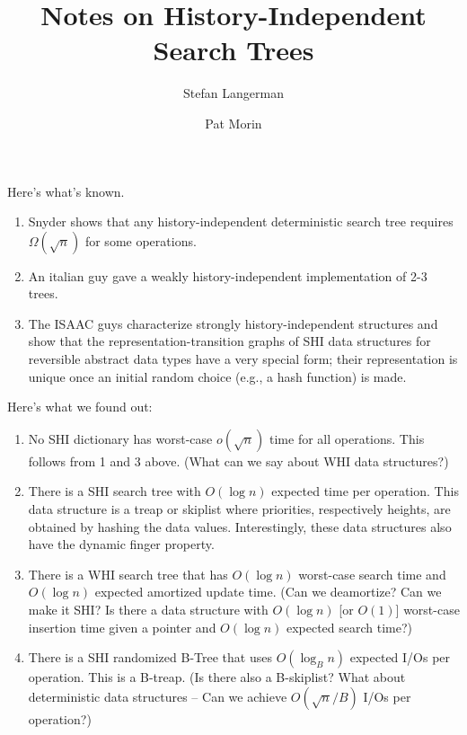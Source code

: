 \documentclass{article}
\title{Notes on History-Independent Search Trees}
\author{Stefan Langerman \and Pat Morin}
\begin{document}
\maketitle

Here's what's known.

\begin{enumerate}
\item Snyder shows that any history-independent deterministic search
tree requires $\Omega(\sqrt{n})$ for some operations.  

\item An italian guy gave a weakly history-independent implementation
of 2-3 trees.  

\item The ISAAC guys characterize strongly history-independent
structures and show that the representation-transition graphs of SHI
data structures for reversible abstract data types have a very special
form; their representation is unique once an initial random choice
(e.g., a hash function) is made.

\end{enumerate}

Here's what we found out:
\begin{enumerate}

\item No SHI dictionary has worst-case $o(\sqrt{n})$ time for all
operations.  This follows from 1 and 3 above.  (What can we say about
WHI data structures?)

\item There is a SHI search tree with $O(\log n)$ expected time per
operation.  This data structure is a treap or skiplist where
priorities, respectively heights, are obtained by hashing the data
values.  Interestingly, these data structures also have the dynamic
finger property.

\item There is a WHI search tree that has $O(\log n)$ worst-case
search time and $O(\log n)$ expected amortized update time.  (Can we
deamortize?  Can we make it SHI? Is there a data structure with
$O(\log n)$ [or $O(1)$] worst-case insertion time given a pointer and
$O(\log n)$ expected search time?)

\item There is a SHI randomized B-Tree that uses $O(\log_B n)$
expected I/Os per operation.  This is a B-treap.  (Is there also a
B-skiplist?  What about deterministic data structures -- Can we
achieve $O(\sqrt{n}/B)$ I/Os per operation?)

\end{enumerate}
\end{document}
